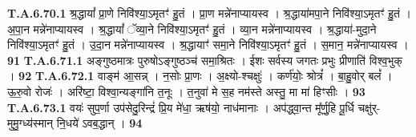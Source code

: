 \documentclass[17pt]{extarticle}
\begin{document}
                  \newline
                                                         \textbf{} \newline \newline
                                \textbf{ T.A.6.70.1} \newline
                  श्र॒द्धायां᳚ प्रा॒णे निवि॑श्या॒ऽमृतꣳ॑ हु॒तं । प्रा॒ण मन्ने॑नाप्यायस्व ।  श्र॒द्धाया॑मपा॒ने निवि॑श्या॒ऽमृतꣳ॑ हु॒तं । अ॒पा॒न मन्ने॑नाप्यायस्व ।  श्र॒द्धायां᳚ ॅव्या॒ने निवि॑श्या॒ऽमृतꣳ॑ हु॒तं । व्या॒न मन्ने॑नाप्यायस्व ।  श्र॒द्धाया॑-मुदा॒ने निवि॑श्या॒ऽमृतꣳ॑ हु॒तं । उ॒दा॒न मन्ने॑नाप्यायस्व ।  श्र॒द्धायाꣳ॑ समा॒ने निवि॑श्या॒ऽमृतꣳ॑ हु॒तं ।  स॒मान॒ मन्ने॑नाप्यायस्व । \textbf{ 91} \newline
                  \newline
                                                         \textbf{} \newline \newline
                                \textbf{ T.A.6.71.1} \newline
                  अङ्गुष्ठमात्रः पुरुषोऽङ्गुष्ठञ्च॑ समा॒श्रितः ।  ईशः सर्वस्य जगतः प्रभुः प्रीणाति॑ विश्व॒भुक् । \textbf{ 92} \newline
                  \newline
                                                         \textbf{} \newline \newline
                                \textbf{ T.A.6.72.1} \newline
                  वाङ्म॑ आ॒सन्न् । न॒सोः प्रा॒णः । अ॒क्ष्यो-श्चक्षुः॑ । कर्ण॑योः॒ श्रोत्रं᳚ । बा॒हु॒वोर् बलं᳚ । ऊ॒रु॒वो रोजः॑ । अरि॑ष्टा॒ विश्वा॒न्यङ्गा॑नि त॒नूः ।  त॒नुवा॑ मे स॒ह नम॑स्ते अस्तु॒ मा मा॑ हिꣳसीः । \textbf{ 93} \newline
                  \newline
                                                         \textbf{} \newline \newline
                                \textbf{ T.A.6.73.1} \newline
                  वयः॑ सुप॒र्णा उप॑सेदु॒रिन्द्रं॑ प्रि॒य मे॑धा॒ ऋष॑यो॒ नाध॑मानाः । अप॑द्ध्वा॒न्त मू᳚र्णु॒हि पू॒र्धि चक्षु॑र्-मुमु॒ग्ध्य॑स्मान् नि॒धये॑ ऽवब॒द्धान् । \textbf{ 94} \newline
                  \newline
                                                         \textbf{} \newline \newline
\end{document}
